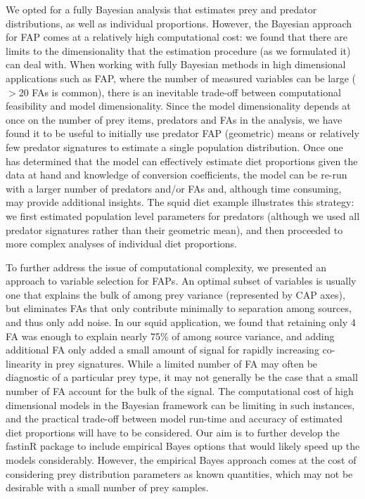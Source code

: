 \documentclass[fleqn,10pt]{wlpeerj}
\begin{document}
We opted for a fully Bayesian analysis that estimates prey and predator
distributions, as well as individual proportions. However, the Bayesian
approach for FAP comes at a relatively
high computational cost: we found that there are limits to the dimensionality
that the estimation procedure (as we formulated it) can deal with. When working with
fully Bayesian methods in high dimensional applications such as FAP,
where the number of measured variables can be large ($>$20 FAs is common), there
is an inevitable trade-off between computational feasibility and
model dimensionality. Since the model dimensionality depends at once on the number of prey items, predators and
FAs in the analysis, we have found it to be useful to
initially use
predator FAP (geometric) means or relatively few predator signatures to
estimate a single population distribution. Once one has determined
that the model can effectively estimate diet proportions given the
data at hand and knowledge of conversion coefficients, the model can
be re-run with a larger number of predators and/or FAs and, although time consuming, may provide additional
insights. The squid diet example illustrates this strategy: we first
estimated population level parameters for predators (although we used
all predator signatures rather than their geometric mean), and then
proceeded to more complex analyses of individual diet proportions.

To further address the issue of computational complexity, we presented
an approach to variable selection for FAPs. An optimal subset of
variables is usually one that explains the bulk of among prey variance
(represented by CAP axes), but eliminates FAs that only contribute
minimally to separation among sources, and thus only add noise. In our
squid application, we found that retaining only 4 FA was enough to
explain nearly 75\% of among source variance, and adding additional FA
only added a small amount of signal for rapidly increasing
co-linearity in prey signatures. While a limited number of FA may
often be diagnostic of a particular prey type, it may not generally be
the case that a small number of FA account for the bulk of the
signal. The computational cost of high dimensional models in the
Bayesian framework can be limiting in such instances, and the
practical trade-off between model run-time and accuracy of estimated
diet proportions will have to be considered. Our aim is to further
develop the fastinR package to include empirical Bayes options \citep[as
described in][]{parnell_bayesian_2012} that would likely speed up
the models considerably. However, the empirical Bayes approach comes at the cost of considering prey
distribution parameters as known quantities, which may not be desirable with a
small number of prey samples.
\end{document}
